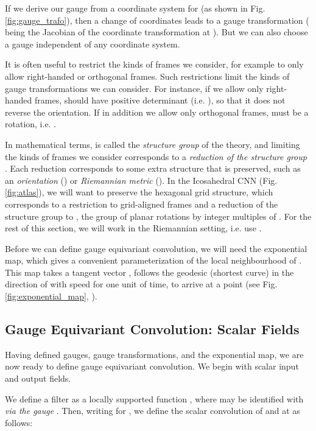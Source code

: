 \documentclass{article}
\begin{document}
If we derive our gauge from a coordinate system for  (as shown in Fig. \ref{fig:gauge_trafo}), then a change of coordinates leads to a gauge transformation ( being the Jacobian of the coordinate transformation at ).
But we can also choose a gauge  independent of any coordinate system.

It is often useful to restrict the kinds of frames we consider, for example to only allow right-handed or orthogonal frames.
Such restrictions limit the kinds of gauge transformations we can consider.
For instance, if we allow only right-handed frames,  should have positive determinant (i.e. ), so that it does not reverse the orientation.
If in addition we allow only orthogonal frames,  must be a rotation, i.e. .

In mathematical terms,  is called the \emph{structure group} of the theory, and limiting the kinds of frames we consider corresponds to a \emph{reduction of the structure group} \cite{husemollerFibreBundles1994a}.
Each reduction corresponds to some extra structure that is preserved, such as an \emph{orientation} () or \emph{Riemannian metric} ().
In the Icosahedral CNN (Fig. \ref{fig:atlas}), we will want to preserve the hexagonal grid structure, which corresponds to a restriction to grid-aligned frames and a reduction of the structure group to , the group of planar rotations by integer multiples of .
For the rest of this section, we will work in the Riemannian setting, i.e. use .

Before we can define gauge equivariant convolution, we will need the exponential map, which gives a convenient parameterization of the local neighbourhood of .
This map  takes a tangent vector , follows the geodesic (shortest curve) in the direction of  with speed  for one unit of time, to arrive at a point  (see Fig. \ref{fig:exponential_map}, \cite{leeIntroductionRiemannianManifolds2018}).


\subsection{Gauge Equivariant Convolution: Scalar Fields}
\label{sec:gconv_local}

Having defined gauges, gauge transformations, and the exponential map, we are now ready to define gauge equivariant convolution.
We begin with scalar input and output fields.

We define a filter as a locally supported function , where  may be identified with  \emph{via the gauge} .
Then, writing  for , we define the scalar convolution of  and  at  as follows:
\end{document}
